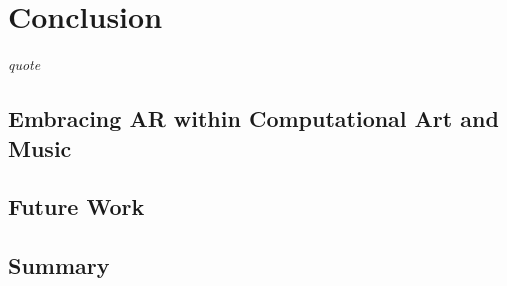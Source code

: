 %
\chapter{Conclusion}
\label{sec: conclusion}
\epigraph{\emph{quote}}{\citep[]{bilbow2022}}

\section{Embracing AR within Computational Art and Music} \label{sec: conclusion-}
\section{Future Work} \label{sec: conclusion-futurework}
\section{Summary} \label{sec: conclusion-summary}